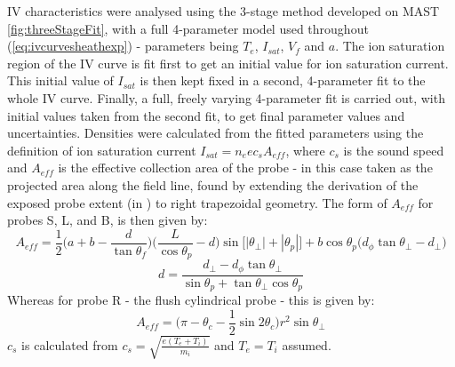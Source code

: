 \documentclass[a4paper, 12pt]{article} %
\begin{document}
	IV characteristics were analysed using the 3-stage method developed on MAST \cref{fig:threeStageFit}, with a full 4-parameter model used throughout (\cref{eq:ivcurvesheathexp}) - parameters being $T_e$, $I_{sat}$, $V_f$ and $a$.
	The ion saturation region of the IV curve is fit first to get an initial value for ion saturation current.
	This initial value of $I_{sat}$ is then kept fixed in a second, 4-parameter fit to the whole IV curve. 
	Finally, a full, freely varying 4-parameter fit is carried out, with initial values taken from the second fit, to get final parameter values and uncertainties.
	Densities were calculated from the fitted parameters using the definition of ion saturation current $I_{sat} = n_e e c_s A_{eff}$, 
	where $c_s$ is the sound speed and $A_{eff}$ is the effective collection area of the probe - in this case taken as the projected area along the field line, found by extending the derivation of the exposed probe extent (in \cite{Harrison}) to right trapezoidal geometry.
	The form of $A_{eff}$ for probes S, L, and B, is then given by:
	\begin{equation}
    	\label{eq:a_eff_alternate}
    	A_{eff} = \frac{1}{2} \bigg(a + b - \frac{d}{\tan{\theta_{f}}} \bigg)\bigg(\frac{L}{\cos{\theta_{p}}} - d\bigg) \sin{\Big[|\theta_{\perp}| + |\theta_{p}|\Big]} + b \cos{\theta_{p}}\Big(d_{\phi}\tan{\theta_{\perp}} - d_{\perp}\Big)
	\end{equation}
	\begin{equation}
    	\label{eq:d}
    	d = \frac{d_{\perp} - d_{\phi}\tan{\theta_{\perp}}}{ \sin{\theta_{p}} + \tan{\theta_{\perp}}\cos{\theta_{p}}}
	\end{equation}
	Whereas for probe R - the flush cylindrical probe - this is given by:
	\begin{equation}
        \label{eq:cylinder_A_coll}
        A_{eff} = \bigg(\pi - \theta_{c} - \frac{1}{2}\sin{2\theta_{c}}\bigg) r^2\sin{\theta_{\perp}}
    \end{equation}
	$c_s$ is calculated from $c_s = \sqrt{\frac{e(T_e + T_i)}{m_i}}$ and $T_e = T_i$ assumed. 
	
\end{document}
